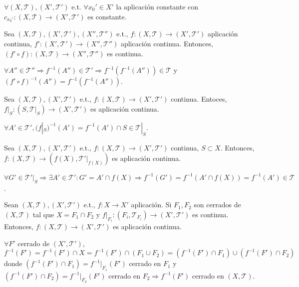 \begin{obs}
  $\forall ( X, \mathcal{T} ), ( X', \mathcal{T}' )$ e.t. $\forall x_{0}' \in X'$ la aplicación constante con $c_{x_{0}'}: ( X, \mathcal{T} ) \to ( X', \mathcal{T}' )$ es constante.
\end{obs}

\begin{prop}
  Sea $( X, \mathcal{T} ), ( X', \mathcal{T}' ), ( X'', \mathcal{T}'' )$ e.t., $f: ( X, \mathcal{T} ) \to ( X', \mathcal{T}' )$ aplicación continua, $f': ( X', \mathcal{T}' ) \to ( X'', \mathcal{T}'' )$ aplicación continua. Entonces, $(f' \circ f): ( X, \mathcal{T} ) \to ( X'', \mathcal{T}'' )$ es continua.
\end{prop}

\begin{dem}
  $\forall A'' \in \mathcal{T''} \Rightarrow f^{-1}(A'') \in \mathcal{T}' \Rightarrow f^{-1}(f^{-1}(A'')) \in \mathcal{T}$ y $(f' \circ f)^{-1}(A'') = f^{-1}(f^{-1}(A''))$.
\end{dem}

\begin{prop}
  Sea $( X, \mathcal{T} ), ( X', \mathcal{T}' )$ e.t., $f: ( X, \mathcal{T} ) \to ( X', \mathcal{T}' )$ continua. Entoces, $f|_{S}: ( S, \mathcal{T}|_{S} ) \to ( X', \mathcal{T}' )$ es aplicación continua.
\end{prop}

\begin{dem}
  $\forall A' \in \mathcal{T}', (f|_{S})^{-1}(A') = f^{-1}(A')\cap S \in \mathcal{T}|_{S}$.
\end{dem}

\begin{prop}
  Sea $( X, \mathcal{T} ), ( X', \mathcal{T}' )$ e.t., $f: ( X, \mathcal{T} ) \to ( X', \mathcal{T}' )$ continua, $ S \subset X$. Entonces, $f: ( X, \mathcal{T} ) \to ( f(X), \mathcal{T'}|_{f(X)})$ es aplicación continua.
\end{prop}

\begin{dem}
  $\forall G' \in \mathcal{T'}|_{S} \Rightarrow \exists A' \in \mathcal{T}': G' = A' \cap f(X) \Rightarrow f^{-1}(G') = f^{-1}(A' \cap f(X)) = f^{-1}(A') \in \mathcal{T}$.
\end{dem}

\begin{prop}
  Sean $( X, \mathcal{T} ), ( X', \mathcal{T}' )$ e.t., $f: X \to X'$ aplicación. Si $F_{1}, F_{2}$ son cerrados de $( X, \mathcal{T} )$ tal que $X = F_{1} \cap F_{2}$ y $f|_{F_{i}}: ( F_{i}, \mathcal{T}_{F_{i}}) \to ( X', \mathcal{T'} )$ es continua. Entonces, $f: ( X, \mathcal{T} ) \to ( X', \mathcal{T}' )$ es aplicación continua.
\end{prop}

\begin{dem}
  $\forall F'$ cerrado de $ ( X', \mathcal{T}' )$, $f^{-1}(F') =f^{-1}(F')\cap X = f^{-1}(F') \cap (F_{1} \cup F_{2}) = (f^{-1}(F')\cap F_{1}) \cup (f^{-1}(F')\cap F_{2})$ donde $(f^{-1}(F')\cap F_{1}) = f^{-1}|_{F_{1}}(F') $ cerrado en $F_{1}$ y $(f^{-1}(F')\cap F_{2}) = f^{-1}|_{F_{2}}(F')$ cerrado en $F_{2} \Rightarrow f^{-1}(F')$ cerrado en $( X, \mathcal{T} )$.
\end{dem}
